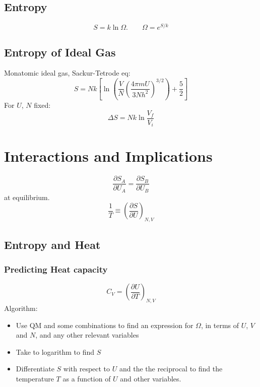 \documentclass[a4paper,norsk, 10pt]{article}
\begin{document}
\subsection{Entropy}
\begin{equation}
S = k\ln\Omega. \qquad \Omega = e^{S/k}
\end{equation}
\subsection{Entropy of Ideal Gas}
Monatomic ideal gas, Sackur-Tetrode eq:
\begin{equation}
S = Nk\left[\ln\left(\frac{V}{N}\left(\frac{4\pi mU}{3Nh^2}\right)^{3/2}\right) + \frac{5}{2}\right]
\end{equation}
For $U$, $N$ fixed:
\begin{equation}
\Delta S = Nk\ln\frac{V_f}{V_i}
\end{equation}
\section{Interactions and Implications}
\begin{equation}
\frac{\partial S_A}{\partial U_A} = \frac{\partial S_B}{\partial U_B}
\end{equation}
at equilibrium.
\begin{equation}
\frac{1}{T}\equiv \left(\frac{\partial S}{\partial U}\right)_{N,V}
\end{equation}
\subsection{Entropy and Heat}
\subsubsection{Predicting Heat capacity}
\begin{equation}
C_V = \left(\frac{\partial U}{\partial T}\right)_{N,V}
\end{equation}
Algorithm:
\begin{itemize}
\item Use QM and some combinations to find an expression for $\Omega$, in terms of $U$, $V$ and $N$, and any other relevant variables
\item Take to logarithm to find $S$
\item Differentiate $S$ with respect to $U$ and the the reciprocal to find the temperature $T$ as a function of $U$ and other variables.
\end{itemize}
\end{document}
